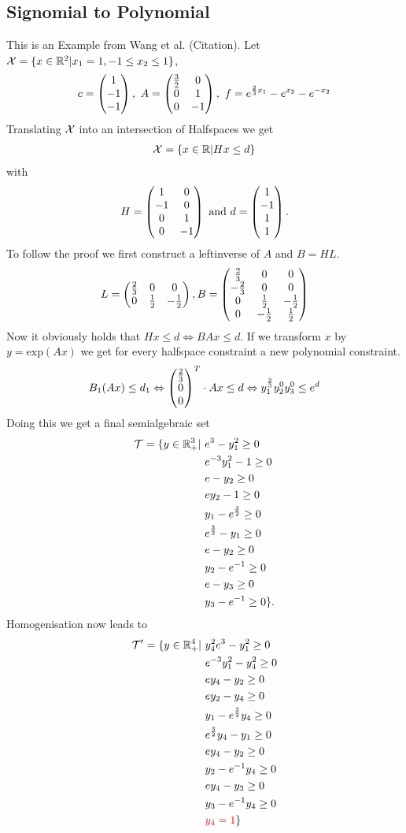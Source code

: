 \documentclass[./main.tex]{subfiles}
\begin{document}
\subsection{Signomial to Polynomial}
This is an Example from Wang et al. (Citation). Let $\mathcal X = \lbrace x \in \mathbb{R}^2 | x_1 = 1, -1\leq x_2 \leq 1 \rbrace$, 
\begin{equation*}
c = \begin{pmatrix}1\\-1\\-1\end{pmatrix}, \ A =  \begin{pmatrix} \frac 3 2 & 0 \\ 0 & 1 \\ 0 & -1 \end{pmatrix}, \ f=e^{\frac 2 3 x_1} - e^{x_2} - e^{-x_2}
\end{equation*}
Translating $\mathcal{X}$ into an intersection of Halfspaces we get
\begin{align*}
\mathcal{X} = \lbrace x \in \mathbb{R} \vert Hx \leq d \rbrace
\end{align*}
with
\begin{align*}
H =  \begin{pmatrix} 1 & 0 \\ -1 & 0 \\ 0 & 1 \\ 0 & -1 \end{pmatrix} \text{ and } d = \begin{pmatrix}1\\-1\\1\\1\end{pmatrix}.
\end{align*}
To follow the proof we first construct a leftinverse of $A$ and $B=HL$.
\begin{align*}
L = \begin{pmatrix} \frac 2 3 & 0 & 0 \\ 0 & \frac 1 2 & -\frac 1 2 \\ \end{pmatrix}, B = \begin{pmatrix} \frac 2 3 & 0 & 0 \\ -\frac 2 3 & 0 & 0 \\ 0 & \frac 1 2 & -\frac 1 2 \\ 0 & -\frac 1 2 & \frac 1 2 \\ \end{pmatrix}
\end{align*}
Now it obviously holds that $Hx \leq d  \Leftrightarrow BAx \leq d$. If we transform $x$ by $y=\text{exp}(Ax)$ we get for every halfspace constraint a new polynomial constraint.
\begin{align*}
B_1(Ax) \leq d_1 \Leftrightarrow  \begin{pmatrix}\frac 2 3\\0\\0\end{pmatrix}^T  \cdot Ax \leq d \Leftrightarrow y_1^{\frac 2 3}y_2^0y_3^0 \leq e^d
\end{align*}
Doing this we get a final semialgebraic set
\begin{align*}
\mathcal{T} = \lbrace y \in \mathbb{R}^3_+ \vert \ & e^3 - y_1^2 \geq 0 \\
& e^{-3}y_1^2 -1 \geq 0 \\
& e - y_2 \geq 0\\
& ey_2 - 1 \geq 0 \\
& y_1 - e^{\frac 3 2} \geq 0 \\
& e^{\frac 3 2} - y_1 \geq 0 \\
&e- y_2 \geq 0 \\
&y_2 -e^{-1}  \geq 0 \\
&e- y_3 \geq 0 \\
&y_3 -e^{-1}  \geq 0 \rbrace.
\end{align*}
Homogenisation now leads to
\begin{align*}
\mathcal{T}' = \lbrace y \in \mathbb{R}^4_+ \vert \ & y_4^2e^3 - y_1^2 \geq 0 \\
& e^{-3}y_1^2 -y_4^2 \geq 0 \\
& ey_4 - y_2 \geq 0\\
& ey_2 - y_4 \geq 0 \\
& y_1 - e^{\frac 3 2}y_4 \geq 0 \\
& e^{\frac 3 2}y_4 - y_1 \geq 0 \\
&ey_4- y_2 \geq 0 \\
&y_2 -e^{-1}y_4  \geq 0 \\
&ey_4- y_3 \geq 0 \\
&y_3 -e^{-1}y_4  \geq 0 \\
&\textcolor{red}{y_4 =  1} \rbrace
\end{align*}
\end{document}
